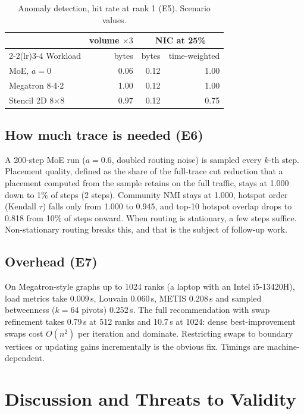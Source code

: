 \documentclass[conference]{IEEEtran}
\begin{document}
\begin{table}[t]
\caption{Anomaly detection, hit rate at rank 1 (E5). Scenario values.}\label{tab:e5}
\centering\footnotesize
\begin{tabular}{@{}lrrr@{}}
\toprule
& volume $\times3$ & \multicolumn{2}{c}{NIC at 25\%} \\
\cmidrule(lr){2-2}\cmidrule(lr){3-4}
Workload & bytes & bytes & time-weighted \\
\midrule
MoE, $a=0$                 & 0.06 & 0.12 & 1.00 \\
Megatron 8$\cdot$4$\cdot$2 & 1.00 & 0.12 & 1.00 \\
Stencil 2D 8$\times$8      & 0.97 & 0.12 & 0.75 \\
\bottomrule
\end{tabular}
\end{table}

\subsection{How much trace is needed (E6)}
A 200-step MoE run ($a=0.6$, doubled routing noise) is sampled every $k$-th step. Placement
quality, defined as the share of the full-trace cut reduction that a placement computed from the
sample retains on the full traffic, stays at 1.000 down to 1\% of steps (2 steps). Community NMI
stays at 1.000, hotspot order (Kendall $\tau$) falls only from 1.000 to 0.945, and top-10 hotspot
overlap drops to 0.818 from 10\% of steps onward. When routing is stationary, a few steps suffice.
Non-stationary routing breaks this, and that is the subject of follow-up work.

\subsection{Overhead (E7)}
On Megatron-style graphs up to 1024 ranks (a laptop with an Intel i5-13420H), load metrics take
0.009\,s, Louvain 0.060\,s, METIS 0.208\,s and sampled betweenness ($k=64$ pivots) 0.252\,s. The
full recommendation with swap refinement takes 0.79\,s at 512 ranks and 10.7\,s at 1024: dense
best-improvement swaps cost $O(n^2)$ per iteration and dominate. Restricting swaps to boundary
vertices or updating gains incrementally is the obvious fix. Timings are machine-dependent.

\section{Discussion and Threats to Validity}\label{sec:threats}
\end{document}
